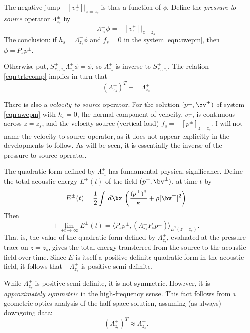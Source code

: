 The negative jump $-[v^{\pm}_{z}]|_{z=z_s}$ is thus a function of $\phi$. Define
the {\em pressure-to-source} operator $\Lambda^{\pm}_{z_s}$ by
\begin{equation}
  \label{eqn:deflam}
  \Lambda^{\pm}_{z_s}\phi = -[v^{\pm}_{z}]|_{z=z_s}
\end{equation}
The conclusion: if $h_s = \Lambda^{\pm}_{z_s}\phi$ and $f_s=0$ in the
system \ref{eqn:awepm}, then $\phi=P_sp^{\pm}$.

Otherwise put, $S^{\pm}_{z_s,z_s}\Lambda^{\pm}_{z_s} \phi = \phi$, so
$\Lambda^{\pm}_{z_s}$ is inverse to $S^{\pm}_{z_s,z_s}$. The relation
\ref{eqn:trtrcomp} implies in turn that
\begin{equation}
  \label{eqn:lamadj}
  (\Lambda^{\pm}_{z_s})^T = - \Lambda^{\mp}_{z_s}
\end{equation}

There is also a {\em velocity-to-source} operator. For the solution
$(p^{\pm},\bv^{\pm})$ of system \ref{eqn:awepm} with $h_s=0$, the
normal component of velocity, $v^{\pm}_z$, is continuous across
$z=z_s$, and the velocity source (vertical load)
$f_s=-[p^{\pm}]_{z=z_s}$. I will not name the velocity-to-source
operator, as it does not appear explicitly in the developments to
follow. As will be seen, it is essentially the inverse of the
pressure-to-source operator.

The quadratic form defined by $\Lambda^{\pm}_{z_s}$ has fundamental
physical significance. Define the total acoustic energy $E^{\pm}(t)$ of the
field $(p^{\pm},\bv^{\pm})$, at time $t$ by
\begin{equation}
  \label{eqn:defae0}
  E^{\pm}(t) = \frac{1}{2} \int \,d\bx \, \left(\frac{(p^{\pm})^2}{\kappa} + \rho |\bv^{\pm}|^2\right)
\end{equation}
Then
\begin{equation}
  \label{eqn:elim}
  \pm \lim_{\pm t \rightarrow \infty} E^{\pm}(t) =  \langle P_sp^{\pm},
  (\Lambda^{\pm}_{z_s} P_sp^{\pm}) \rangle_{L^2(z=z_s)}.
\end{equation}
That is, the value of the quadratic form defined by
$\Lambda^{\pm}_{z_s}$, evaluated at the pressure trace on $z=z_s$,
gives the total energy transferred from the source to the
acoustic field over time. Since $E$ is itself a positive definite
quadratic form in the acoustic field, it follows that $\pm
\Lambda^{\pm}_{z_s}$ is positive semi-definite. 

While $\Lambda^{\pm}_{z_s}$ is positive semi-definite, it is not
symmetric. However, it is {\em approximately symmetric} in the
high-frequency sense. This fact follows from a
geometric optics analysis of the half-space solution,
assuming (as always) downgoing data:
\begin{equation}
  \label{eqn:lamappsim}
  (\Lambda^{\pm}_{z_s})^T \approx \Lambda^{\pm}_{z_s}.
\end{equation}

